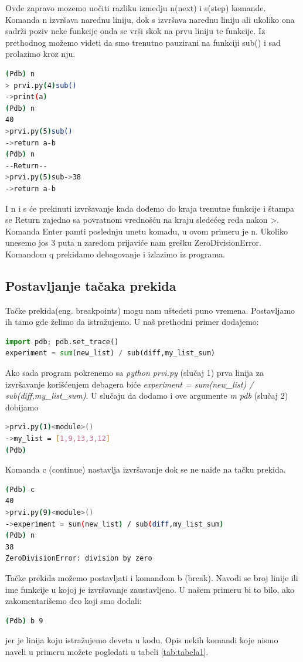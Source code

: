 \documentclass[a4paper]{article}
\begin{document}
Ovde zapravo mozemo uočiti razliku izmedju n(next) i s(step) komande. Komanda n izvršava narednu liniju, dok s izvršava narednu liniju ali ukoliko ona sadrži poziv neke funkcije onda se vrši skok na prvu liniju te funkcije. Iz prethodnog možemo videti da smo trenutno pauzirani na funkciji sub() i sad prolazimo kroz nju.
\begin{lstlisting}[language = bash, caption={Izvršavamo prve tri linije u funkciji \emph{sub(40, 2)}}]
(Pdb) n
> prvi.py(4)sub()
->print(a)
(Pdb) n
40
>prvi.py(5)sub()
->return a-b
(Pdb) n
--Return--
>prvi.py(5)sub->38
->return a-b
\end{lstlisting}
I n i s će prekinuti izvršavanje kada dođemo do kraja trenutne funkcije i štampa se \textendash \textendash Return \textendash\textendash zajedno sa povratnom vrednošću na kraju sledećeg reda nakon \textendash>. Komanda Enter pamti poslednju unetu komadu, u ovom primeru je n. Ukoliko unesemo jos 3 puta n zaredom prijaviće nam grešku ZeroDivisionError. Komandom q prekidamo debagovanje i izlazimo iz programa.
\subsection{Postavljanje tačaka prekida}
Tačke prekida(eng. breakpoints) mogu nam uštedeti puno vremena. Postavljamo ih tamo gde želimo da istražujemo. U naš prethodni primer dodajemo:
\begin{lstlisting}[language = python, caption = {U primer prvi.py na ovom mestu dodata prva linija}]
import pdb; pdb.set_trace()
experiment = sum(new_list) / sub(diff,my_list_sum)
\end{lstlisting}
Ako sada program pokrenemo sa \emph{python prvi.py} (slučaj 1) prva linija za izvršavanje korišćenjem debagera biće \emph{experiment = sum(new\_list) / sub(diff,my\_list\_sum)}. U slučaju da dodamo i ove argumente \emph{\textendash m  pdb} (slučaj 2) dobijamo
\begin{lstlisting}[language = bash, caption={U slučaju 2 izvršavanje kreće od prve linije}]
>prvi.py(1)<module>()
->my_list = [1,9,13,3,12]
(Pdb)
\end{lstlisting}
Komanda c (continue) nastavlja izvršavanje dok se ne naiđe na tačku prekida.
\begin{lstlisting}[language = bash, caption={Nastavlja se izvršavanje do tačke prekida i izvršava sledeću liniju}]
(Pdb) c
40
>prvi.py(9)<module>()
->experiment = sum(new_list) / sub(diff,my_list_sum)
(Pdb) n
38
ZeroDivisionError: division by zero
\end{lstlisting}
Tačke prekida možemo postavljati i komandom b (break). Navodi se broj linije ili ime funkcije u kojoj je izvršavanje zaustavljeno. U našem primeru bi to bilo, ako zakomentarišemo deo koji smo dodali:
\begin{lstlisting}[language = bash, caption={Na liniji 9 postavljamo tačku prekida}]
(Pdb) b 9 
\end{lstlisting}
jer je linija koju istražujemo deveta u kodu.
Opis nekih komandi koje nismo naveli u primeru možete pogledati u tabeli \ref{tab:tabela1}.
\end{document}
